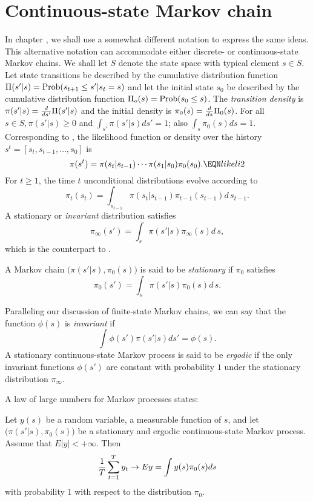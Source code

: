 \section{Continuous-state Markov chain}
In chapter , we shall  use a somewhat different
notation to express the same ideas. This alternative notation can
accommodate either discrete- or continuous-state Markov chains.  We
shall let $S$ denote the state space with typical element $s \in
S$.     Let state transitions be described by the cumulative distribution function
$\Pi(s' | s) =  {\rm
Prob} (s_{t+1} \leq  s' | s_t =s)$ and let the initial state $s_0$ be described by
 the cumulative distribution function $\Pi_o(s) =  {\rm
Prob} (s_0 \leq s)$.  The {\it transition density\/} is $\pi(s' | s )  =  {d \over d s'} \Pi(s'|s)$
and the initial density is %
$\pi_0(s) = {d \over d s} \Pi_0(s)$.  For all $s\in S, \pi(s'|s )
\geq 0$ and $  \int_{s'} \pi(s'|s) d s' =1$; also $\int_s \pi_0(s) d s
=1$.
Corresponding to , the likelihood function or density
over the history $s^t = [s_t, s_{t-1}, \ldots, s_0]$
is
 $$ \pi(s^t) = \pi(s_t | s_{t-1} )\cdots \pi(s_1| s_0) \pi_0 (s_0).
  \EQN likeli2 $$
For $t\geq 1$, the time $t$ unconditional distributions
evolve according to
$$ \pi_t(s_t) = \int_{s_{t-1}} \pi(s_t|s_{t-1}) \pi_{t-1} (s_{t-1})
     d \, s_{t-1} .$$
A stationary or  {\it invariant\/} distribution
satisfies
$$ \pi_\infty(s') = \int_s \pi(s'|s) \pi_\infty (s) d \, s, $$
which is the counterpart to
.

\medskip
{} A Markov chain $\bigl(\pi(s'|s), \pi_0(s)\bigr)$ is said
to be {\it stationary\/} if $\pi_0$ satisfies
  $$ \pi_0(s') = \int_s \pi(s'|s) \pi_0 (s) d \, s. $$

\medskip

 Paralleling our discussion of finite-state Markov chains,
we can say that the function $\phi(s) $ is {\it invariant\/} if
$$ \int \phi(s') \pi(s'| s) d s' = \phi(s). $$
A stationary continuous-state Markov process is said to be {\it ergodic\/}
if the only invariant functions  $\phi(s')$ are constant with probability
$1$ under the stationary distribution $\pi_\infty$.

\medskip

A law of large numbers for Markov processes states:

\medskip
{}
Let $y(s)$ be a random variable, a measurable  function of  $s$,
and let
$\bigl(\pi(s'|s),\pi_0(s)\bigr)$ be  a stationary  and  ergodic   continuous-state
Markov process.   Assume that $E |y| < +\infty$. Then
$$ {1 \over T} \sum_{t=1}^T y_t \rightarrow E y
   = \int y(s) \pi_0(s) ds $$
with probability $1$ with respect to the distribution $\pi_0$.
\endtheorem
{}
